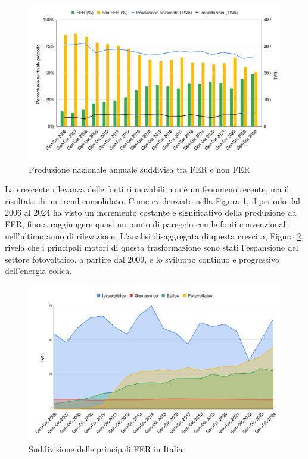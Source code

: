 \begin{figure}[h!]
    \centering
    \includegraphics[trim= 0cm 1.5cm 0cm 0cm, clip, width=0.7\linewidth]{img/Terna-rapporto-annuale-2006-2024-v2.pdf}
    \caption{Produzione nazionale annuale suddivisa tra FER e non FER \cite{terna-rapporto-mensile-sito}}
    \label{graph:Terna-rapporto-annuale-2006-2024}
\end{figure}



La crescente rilevanza delle fonti rinnovabili non è un fenomeno recente, ma il risultato di un trend consolidato. Come evidenziato nella Figura \ref{graph:Terna-rapporto-annuale-2006-2024}, il periodo dal 2006 al 2024 ha visto un incremento costante e significativo della produzione da FER, fino a raggiungere quasi un punto di pareggio con le fonti convenzionali nell'ultimo anno di rilevazione. L'analisi disaggregata di questa crescita, Figura \ref{graph:Terna-FER-a-confronto-2006-2024}, rivela che i principali motori di questa trasformazione sono stati l'espansione del settore fotovoltaico, a partire dal 2009, e lo sviluppo continuo e progressivo dell'energia eolica.

\begin{figure}[h!]
    \centering
    \includegraphics[trim= 0cm 1cm 0cm 1.05cm, clip, width=0.7\linewidth]{img/Terna-FER-a-confronto-2006-2024-v2.pdf}
    \caption{Suddivisione delle principali FER in Italia \cite{terna-rapporto-mensile-sito}}
    \label{graph:Terna-FER-a-confronto-2006-2024}
\end{figure}


